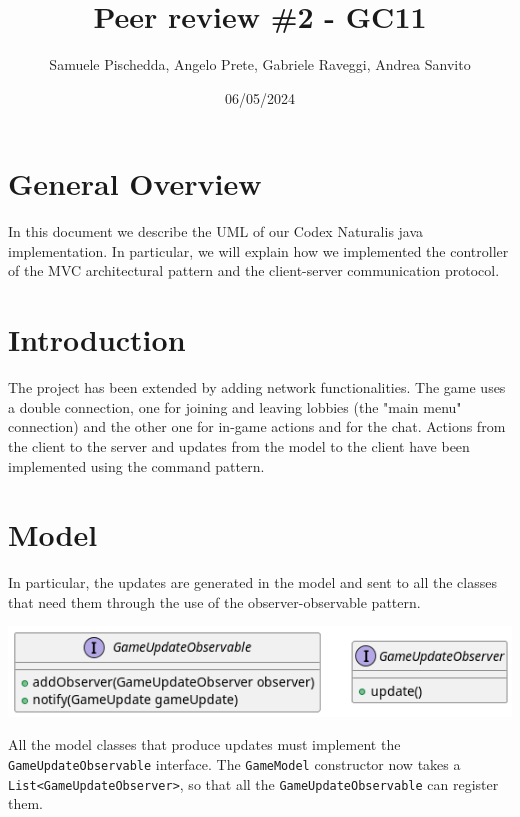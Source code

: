 \documentclass{article}
\title{Peer review \#2 - GC11}
\author{Samuele Pischedda, Angelo Prete, Gabriele Raveggi, Andrea Sanvito }
\date{06/05/2024}
\begin{document}
\begin{titlepage}
\maketitle
\end{titlepage}
\section*{General Overview}
In this document we describe the UML of our Codex Naturalis java implementation.
In particular, we will explain how we implemented the controller of the MVC architectural pattern and the client-server communication protocol.

\section*{Introduction}
The project has been extended by adding network functionalities.
The game uses a double connection, one for joining and leaving lobbies (the "main menu" connection) and the other one for in-game actions and for the chat.
Actions from the client to the server and updates from the model to the client have been implemented using the command pattern.
\section{Model}
In particular, the updates are generated in the model and sent to all the classes that need them through the use of the observer-observable pattern.
\begin{center}
    \includegraphics[scale=0.5]{pngs/observer}
\end{center}
All the model classes that produce updates must implement the \texttt{GameUpdateObservable} interface.
The \texttt{GameModel} constructor now takes a \texttt{List<GameUpdateObserver>}, so that all the \texttt{GameUpdateObservable} can register them.
\end{document}
